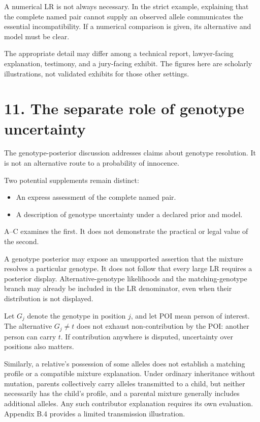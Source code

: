 \documentclass[
]{article}
\providecommand{\tightlist}{%
  \setlength{\itemsep}{0pt}\setlength{\parskip}{0pt}}
\begin{document}
A numerical LR is not always necessary. In the strict example,
explaining that the complete named pair cannot supply an observed allele
communicates the essential incompatibility. If a numerical comparison is
given, its alternative and model must be clear.

The appropriate detail may differ among a technical report,
lawyer-facing explanation, testimony, and a jury-facing exhibit. The
figures here are scholarly illustrations, not validated exhibits for
those other settings.

\section{11. The separate role of genotype
uncertainty}\label{the-separate-role-of-genotype-uncertainty}

The genotype-posterior discussion addresses claims about genotype
resolution. It is not an alternative route to a probability of
innocence.

Two potential supplements remain distinct:

\begin{itemize}
\tightlist
\item
  An express assessment of the complete named pair.
\item
  A description of genotype uncertainty under a declared prior and
  model.
\end{itemize}

A--C examines the first. It does not demonstrate the practical or legal
value of the second.

A genotype posterior may expose an unsupported assertion that the
mixture resolves a particular genotype. It does not follow that every
large LR requires a posterior display. Alternative-genotype likelihoods
and the matching-genotype branch may already be included in the LR
denominator, even when their distribution is not displayed.

Let \(G_j\) denote the genotype in position \(j\), and let POI mean
person of interest. The alternative \(G_j\ne t\) does not exhaust
non-contribution by the POI: another person can carry \(t\). If
contribution anywhere is disputed, uncertainty over positions also
matters.

Similarly, a relative's possession of some alleles does not establish a
matching profile or a compatible mixture explanation. Under ordinary
inheritance without mutation, parents collectively carry alleles
transmitted to a child, but neither necessarily has the child's profile,
and a parental mixture generally includes additional alleles. Any such
contributor explanation requires its own evaluation. Appendix B.4
provides a limited transmission illustration.
\end{document}
